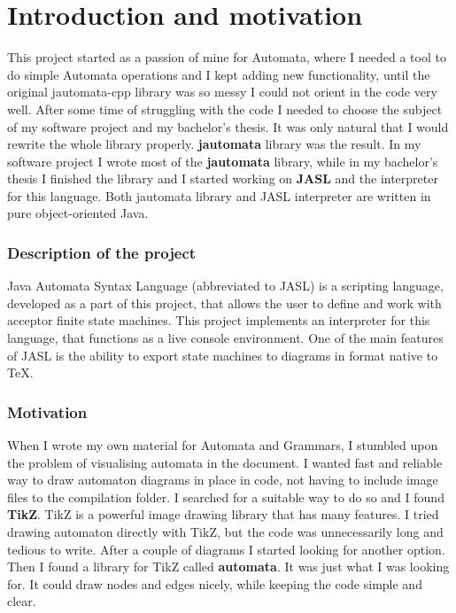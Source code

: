 \documentclass{ctuthesis}
\begin{document}
\maketitle

\chapter{Introduction and motivation}
This project started as a passion of mine for Automata, where I needed a tool to do simple Automata operations and I kept adding new functionality, until the original jautomata-cpp library was so messy I could not orient in the code very well. After some time of struggling with the code I needed to choose the subject of my software project and my bachelor's thesis. It was only natural that I would rewrite the whole library properly. \textbf{jautomata} library was the result. In my software project I wrote most of the \textbf{jautomata} library, while in my bachelor's thesis I finished the library and I started working on \textbf{JASL} and the interpreter for this language. Both jautomata library and JASL interpreter are written in pure object-oriented Java. 

\subsection{Description of the project}
Java Automata Syntax Language (abbreviated to JASL) is a scripting language, developed as a part of this project, that allows the user to define and work with acceptor finite state machines. This project implements an interpreter for this language, that functions as a live console environment. One of the main features of JASL is the ability to export state machines to diagrams in format native to \TeX.

\subsection{Motivation}

When I wrote my own material for Automata and Grammars, I stumbled upon the problem of visualising automata in the document. I wanted fast and reliable way to draw automaton diagrams in place in code, not having to include image files to the compilation folder. I searched for a suitable way to do so and I found \textbf{TikZ}. TikZ is a powerful image drawing library that has many features. I tried drawing automaton directly with TikZ, but the code was unnecessarily long and tedious to write. After a couple of diagrams I started looking for another option. Then I found a library for TikZ called \textbf{automata}. It was just what I was looking for. It could draw nodes and edges nicely, while keeping the code simple and clear. 
\end{document}
